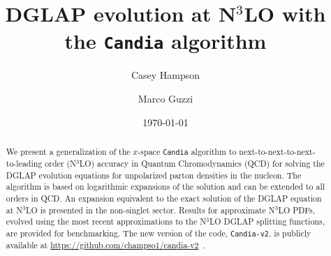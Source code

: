 \documentclass[12pt,notitlepage,aps,preprintnumbers,superscriptaddress,nofootinbib,aps,prd,floatfix]{revtex4-2}
\begin{document}
\preprint{}
\title{DGLAP evolution at N\texorpdfstring{$^3$}{3}LO with the  \texttt{Candia} algorithm}

\author{Casey Hampson }

\author{Marco Guzzi }


\date{\today}
\begin{abstract}
We present a generalization of the $x$-space \texttt{Candia} algorithm to next-to-next-to-next-to-leading order (N$^3$LO) accuracy in Quantum Chromodynamics (QCD) for solving the DGLAP evolution equations for unpolarized parton densities in the nucleon.
The algorithm is based on logarithmic expansions of the solution and can be extended to all orders in QCD. 
An expansion equivalent to the exact solution of the DGLAP equation at N$^3$LO is presented in the non-singlet sector. 
Results for approximate N$^3$LO PDFs, evolved using the most recent approximations to the N$^3$LO DGLAP splitting functions, 
are provided for benchmarking. The new version of the code, \texttt{Candia-v2}, 
is publicly available at \url{https://github.com/champso1/candia-v2}~\cite{candiav2}.

\end{abstract}

\maketitle
\tableofcontents

\newpage 
\end{document}
